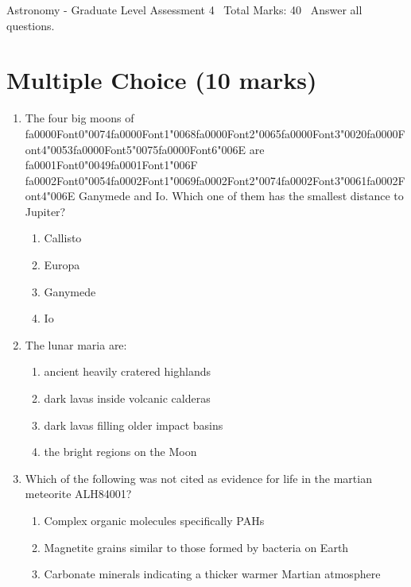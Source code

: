 \documentclass[12pt]{article}
\begin{document}
\begin{center}
Astronomy - Graduate Level Assessment 4 \
Total Marks: 40 \
Answer all questions.
\end{center}

\section*{Multiple Choice (10 marks)}
\begin{enumerate}[label=\arabic*.]
\item The four big moons of {\csname fa0000Font0\endcsname\char"0074}{\csname fa0000Font1\endcsname\char"0068}{\csname fa0000Font2\endcsname\char"0065}{\csname fa0000Font3\endcsname\char"0020}{\csname fa0000Font4\endcsname\char"0053}{\csname fa0000Font5\endcsname\char"0075}{\csname fa0000Font6\endcsname\char"006E} are {\csname fa0001Font0\endcsname\char"0049}{\csname fa0001Font1\endcsname\char"006F} {\csname fa0002Font0\endcsname\char"0054}{\csname fa0002Font1\endcsname\char"0069}{\csname fa0002Font2\endcsname\char"0074}{\csname fa0002Font3\endcsname\char"0061}{\csname fa0002Font4\endcsname\char"006E} Ganymede and Io. Which one of them has
the smallest distance to Jupiter?
\begin{enumerate}[label=(\alph*)]
    \item Callisto
    \item Europa
    \item Ganymede
    \item Io
\end{enumerate}
\item The lunar maria are:
\begin{enumerate}[label=(\alph*)]
    \item ancient heavily cratered highlands
    \item dark lavas inside volcanic calderas
    \item dark lavas filling older impact basins
    \item the bright regions on the Moon
\end{enumerate}
\item Which of the following was not cited as evidence for life in the martian meteorite
ALH84001?
\begin{enumerate}[label=(\alph*)]
    \item Complex organic molecules specifically PAHs
    \item Magnetite grains similar to those formed by bacteria on Earth
    \item Carbonate minerals indicating a thicker warmer Martian atmosphere

\end{enumerate}
\end{enumerate}
\end{document}
